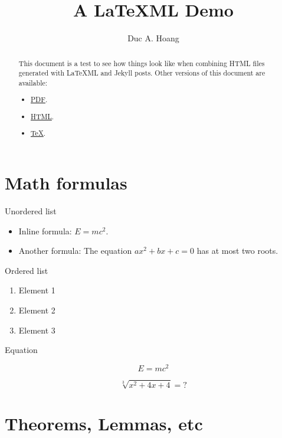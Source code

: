 \documentclass[a4paper]{article}
\title{}
\author{}
\title{A LaTeXML Demo}
\author{Duc A. Hoang}
\theoremstyle{definition}
\theoremstyle{remark}
\numberwithin{equation}{section}
\begin{document}
\nocite{*}


\maketitle

\begin{abstract}
This document is a test to see how things look like when combining HTML files generated with LaTeXML and Jekyll posts.
Other versions of this document are available:
\begin{itemize}
	\iflatexml
	\item \href{https://hoanganhduc.github.io/static/posts/a-latexml-demo/main.pdf}{PDF}.
	\else
	\item \href{https://hoanganhduc.github.io/blog/2021/01/08/a-latexml-demo/}{HTML}.
	\fi
	\item \href{https://hoanganhduc.github.io/static/posts/a-latexml-demo/main.zip}{TeX}.
\end{itemize}
\end{abstract}

\tableofcontents

\section{Math formulas}

Unordered list

\begin{itemize}
\item Inline formula: $E = mc^2$.
\item Another formula: The equation $ax^2 + bx + c = 0$ has at most two roots.
\end{itemize}

Ordered list

\begin{enumerate}
\item Element 1
\item Element 2
\item Element 3
\end{enumerate}

Equation

\begin{equation}
E = mc^2
\end{equation}

\[
	\sqrt[3]{x^2 + 4x + 4} = ?
\]

\section{Theorems, Lemmas, etc}
\end{document}
